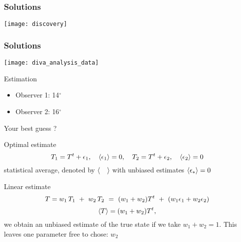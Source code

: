 
\begin{frame}
\frametitle{Solutions}
\centerline{
\texttt{[image: discovery]}
}
\end{frame}


\begin{frame}
\frametitle{Solutions}
\centerline{
\texttt{[image: diva\_analysis\_data]}
}
\end{frame}


\begin{frame}{Estimation}
\begin{itemize}
\item
Observer 1: 14$^\circ$
\item
Observer 2: 16$^\circ$
\end{itemize}

\centerline{Your best guess ?}

\end{frame}


\begin{frame}{Optimal estimate}
\begin{equation}
T_1 = {T}^t+\epsilon_1, \quad \left\langle \epsilon_1 \right\rangle = 0, \quad T_2 = {T}^t+\epsilon_2, \quad \left\langle \epsilon_2 \right\rangle = 0
\end{equation}
statistical average, denoted by $\left\langle \quad \right\rangle$ with unbiased estimates $\left\langle \epsilon_* \right\rangle=0$

Linear estimate
\begin{equation}
{T}=w_1 \, T_1 ~+~ w_2 \, T_2 ~=~ (w_1+w_2) {T}^t ~+~ (w_1 \epsilon_1 + w_2 \epsilon_2)
\end{equation}
\begin{equation}
\left\langle {T} \right\rangle = (w_1+w_2) {T}^t,
\end{equation}
we obtain an unbiased estimate of the true state if we take $w_1+w_2=1$. This leaves one parameter free to chose: $w_2$
\begin{center}
\end{center}
\end{frame}

